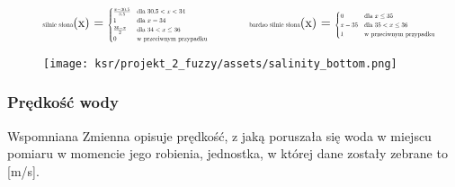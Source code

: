 \documentclass{article}
\begin{document}
\begin{equation*}
\begin{minipage}{0.5\textwidth}
\centering
\text{\scalebox{0.5}{silnie słona}}(x) = \scalebox{0.5}{$
\begin{cases}
\frac{x - 30.5}{3.5} & \text{dla } 30.5 < x < 34 \\
1 & \text{dla } x = 34 \\
\frac{36 - x}{2} & \text{dla } 34 < x \leq 36 \\
0 & \text{w przeciwnym przypadku}
\end{cases}
$}
\end{minipage}%
\begin{minipage}{0.5\textwidth}
\centering
\text{\scalebox{0.5}{bardzo silnie słona}}(x) = \scalebox{0.5}{$
\begin{cases}
0 & \text{dla } x \leq 35 \\
x - 35 & \text{dla } 35 < x \leq 36 \\
1 & \text{w przeciwnym przypadku}
\end{cases}
$}
\end{minipage}
\end{equation*}



\begin{figure}[H]
\centering
\texttt{[image: ksr/projekt\_2\_fuzzy/assets/salinity\_bottom.png]}
\label{fig:epsilon_bat}
\end{figure}

\subsubsection{Prędkość wody}

\noindent Wspomniana Zmienna opisuje prędkość, z jaką poruszała się woda w miejscu pomiaru w momencie jego robienia, jednostka, w której dane zostały zebrane to [m/s].
\end{document}
